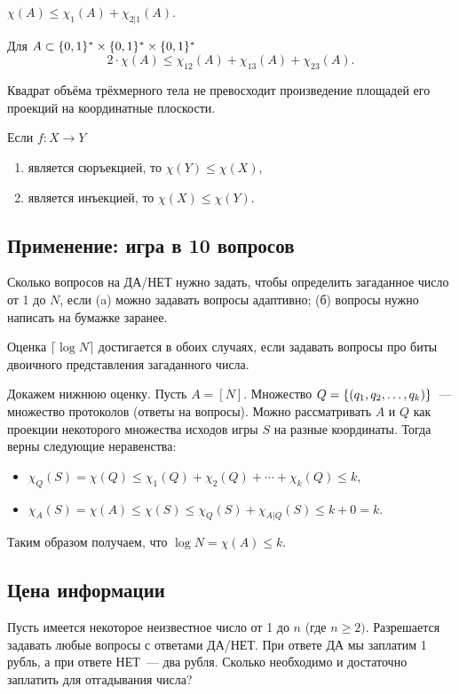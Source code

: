 \documentclass[12pt]{article}
\begin{document}
\begin{theorem} 
\(\chi(A) \le \chi_1(A) + \chi_{2|1}(A)\).
\end{theorem}

\begin{theorem}\label{thm:volume}
Для \(A\subset\{0,1\}^*\times\{0,1\}^*\times\{0,1\}^*\)
\[2\cdot\chi(A) \le \chi_{12}(A) + \chi_{13}(A) + \chi_{23}(A).\]
\end{theorem}
\begin{corollary}
Квадрат объёма трёхмерного тела не превосходит произведение площадей его проекций на координатные плоскости.
\end{corollary}

\begin{statement}
Если \(f: X\to Y\)
\begin{enumerate}
    \item является сюръекцией, то \(\chi(Y)\le \chi(X)\),
    \item является инъекцией, то \(\chi(X)\le \chi(Y)\).
\end{enumerate}
\end{statement}

\subsection{Применение: игра в 10 вопросов}
Сколько вопросов на ДА/НЕТ нужно задать, чтобы определить загаданное число от 1 до \(N\), если (a) можно задавать вопросы адаптивно; (б) вопросы нужно написать на бумажке заранее.

Оценка \(\lceil\log N\rceil \) достигается в обоих случаях, если задавать вопросы про биты двоичного представления загаданного числа.

Докажем нижнюю оценку. Пусть \(A=[N]\). Множество \(Q = \{({q}_1,{q}_2,\dotsc,{q}_{k})\}\)~--- множество протоколов (ответы на вопросы). 
Можно рассматривать \(A\) и \(Q\) как проекции некоторого множества исходов игры \(S\) на разные координаты. Тогда верны следующие неравенства:
\begin{itemize}
\item \( \chi_Q(S) = \chi(Q) \le \chi_1(Q) + \chi_2(Q) + \dotsb + \chi_k(Q) \le k, \)
\item \( \chi_A(S) = \chi(A) \le \chi(S) \le \chi_Q(S) + \chi_{A|Q}(S) \le k + 0 = k. \)
\end{itemize}
Таким образом получаем, что \(\log N = \chi(A) \le k\).

\subsection{Цена информации}
Пусть имеется некоторое неизвестное число от 1 до \(n\) (где \(n\ge2)\).
Разрешается задавать любые вопросы с ответами ДА/НЕТ. При ответе ДА мы
заплатим 1 рубль, а при ответе НЕТ~— два рубля. Сколько необходимо и достаточно заплатить для отгадывания числа?
\end{document}
